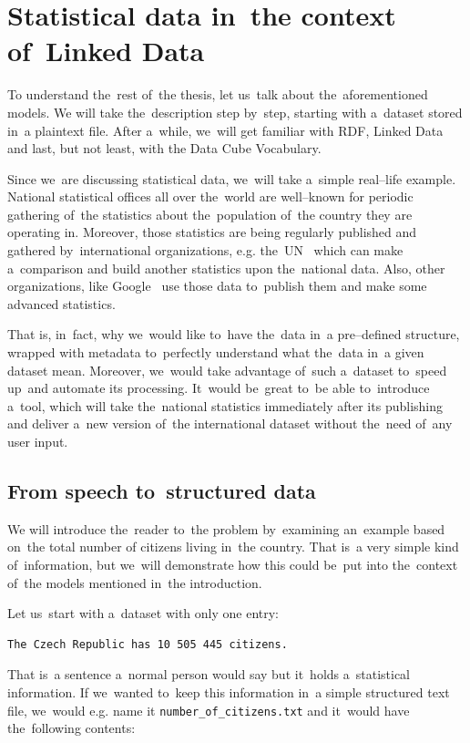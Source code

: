 \chapter{Statistical data in~the context of~Linked Data}
\label{ch:statistical-data}
To understand the~rest of~the thesis, let us~talk about the~aforementioned models.
We will take the~description step by~step, starting with a~dataset stored in~a plaintext file.
After a~while, we~will get familiar with RDF, Linked Data and last, but not least, with the
Data Cube Vocabulary.

Since we~are discussing statistical data, we~will take a~simple real--life example.
National statistical offices all over the~world are well--known for periodic gathering of~the
statistics about the~population of~the country they are operating in. Moreover, 
those statistics are being regularly published and gathered by~international 
organizations, e.g. the~UN~\cite{un} which can make a~comparison and build 
another statistics upon the~national data. Also, other organizations, like 
Google~\cite{pubdata} use those data to~publish them and make 
some advanced statistics.

That is, in~fact, why we~would like to~have the~data in~a pre--defined structure,
wrapped with metadata to~perfectly understand what the~data in~a given 
dataset mean. Moreover, we~would take advantage of~such a~dataset to~speed up~and automate its processing. It~would be~great to~be able to~introduce a~tool, 
which will take the~national statistics immediately after its publishing and 
deliver a~new version of~the international dataset without the~need of~any user 
input.

\section{From speech to~structured data}

We will introduce the~reader to~the problem by~examining an~example based on~the total number of
citizens living in~the country. That is~a very simple kind of~information, but we~will demonstrate
how this could be~put into the~context of~the models mentioned in~the introduction.

Let us~start with a~dataset with only one entry:

\begin{verbatim}
The Czech Republic has 10 505 445 citizens.
\end{verbatim}

That is~a sentence a~normal person would say but it~holds a~statistical information.
If we~wanted to~keep this information in~a simple structured text file, we~would e.g. name it
\texttt{number\_of\_citizens.txt} and it~would have the~following contents:


